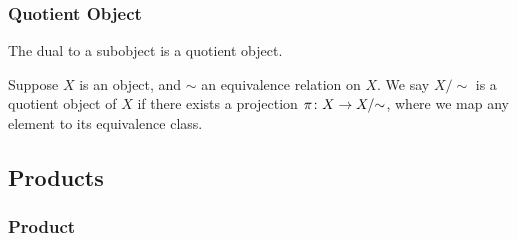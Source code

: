 
\subsubsection*{Quotient Object}

\begin{remark}
    The dual to a subobject is a quotient object.
\end{remark}
\begin{definition}
    Suppose \(X\) is an object, and \(\sim\) an equivalence relation on \(X\).
    We say \(X/{\sim}\) is a quotient object of \(X\)
    if there exists a projection \(\pi\colon X\to X/{\sim}\),
    where we map any element to its equivalence class.
\end{definition}



\subsection{Products}

\subsubsection*{Product}

